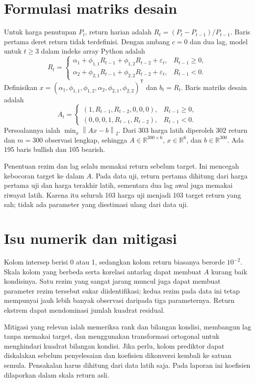 \documentclass[11pt,a4paper]{article}
\newcommand{\R}{\mathbb{R}}
\newcommand{\norm}[1]{\left\lVert #1\right\rVert_2}
\numberwithin{equation}{section}
\begin{document}
\section{Formulasi matriks desain}
Untuk harga penutupan $P_t$, return harian adalah $R_t=(P_t-P_{t-1})/P_{t-1}$. Baris pertama deret return tidak terdefinisi. Dengan ambang $c=0$ dan dua lag, model untuk $t\geq3$ dalam indeks array Python adalah
\begin{equation}
R_t=\begin{cases}
\alpha_1+\phi_{1,1}R_{t-1}+\phi_{1,2}R_{t-2}+\varepsilon_t,& R_{t-1}\geq0,\\
\alpha_2+\phi_{2,1}R_{t-1}+\phi_{2,2}R_{t-2}+\varepsilon_t,& R_{t-1}<0.
\end{cases}
\end{equation}
Definisikan $x=(\alpha_1,\phi_{1,1},\phi_{1,2},\alpha_2,\phi_{2,1},\phi_{2,2})^\mathsf{T}$ dan $b_t=R_t$. Baris matriks desain adalah
\[
A_t=\begin{cases}
(1,R_{t-1},R_{t-2},0,0,0),&R_{t-1}\geq0,\\
(0,0,0,1,R_{t-1},R_{t-2}),&R_{t-1}<0.
\end{cases}
\]
Persoalannya ialah $\min_x\norm{Ax-b}$. Dari 303 harga latih diperoleh 302 return dan $m=300$ observasi lengkap, sehingga $A\in\R^{300\times6}$, $x\in\R^6$, dan $b\in\R^{300}$. Ada 195 baris bullish dan 105 bearish.

Penentuan rezim dan lag selalu memakai return sebelum target. Ini mencegah kebocoran target ke dalam $A$. Pada data uji, return pertama dihitung dari harga pertama uji dan harga terakhir latih, sementara dua lag awal juga memakai riwayat latih. Karena itu seluruh 103 harga uji menjadi 103 target return yang sah; tidak ada parameter yang diestimasi ulang dari data uji.

\section{Isu numerik dan mitigasi}
Kolom intersep berisi 0 atau 1, sedangkan kolom return biasanya berorde $10^{-2}$. Skala kolom yang berbeda serta korelasi antarlag dapat membuat $A$ kurang baik kondisinya. Satu rezim yang sangat jarang muncul juga dapat membuat parameter rezim tersebut sukar diidentifikasi; kedua rezim pada data ini tetap mempunyai jauh lebih banyak observasi daripada tiga parameternya. Return ekstrem dapat mendominasi jumlah kuadrat residual.

Mitigasi yang relevan ialah memeriksa rank dan bilangan kondisi, membangun lag tanpa memakai target, dan menggunakan transformasi ortogonal untuk menghindari kuadrat bilangan kondisi. Jika perlu, kolom prediktor dapat diskalakan sebelum penyelesaian dan koefisien dikonversi kembali ke satuan semula. Pensakalan harus dihitung dari data latih saja. Pada laporan ini koefisien dilaporkan dalam skala return asli.
\end{document}

